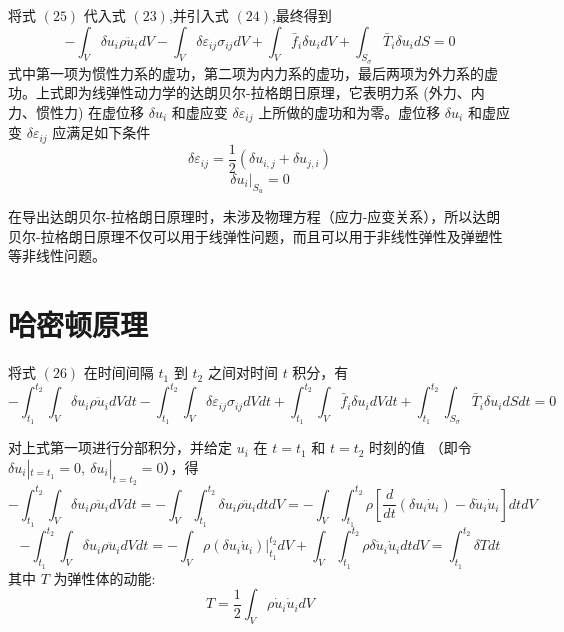 \documentclass[12pt,a4paper]{article}
\begin{document}
将式 $(25)$ 代入式 $(23)$,并引入式 $(24)$,最终得到
\begin{equation}
-\int_{V}\delta u_i\rho\ddot{u}_idV-\int_{V}\delta\varepsilon_{ij}\sigma_{ij}dV+\int_{V} \bar{f}_i\delta u_idV+\int_{S_{\sigma}}\bar{T}_i\delta u_idS=0
\end{equation}
式中第一项为惯性力系的虚功，第二项为内力系的虚功，最后两项为外力系的虚功。上式即为线弹性动力学的达朗贝尔-拉格朗日原理，它表明力系 (外力、内力、惯性力) 在虚位移 $\delta u_i$ 和虚应变 $\delta\varepsilon_{ij}$ 上所做的虚功和为零。虚位移 $\delta u_i$ 和虚应变 $\delta\varepsilon_{ij}$ 应满足如下条件
\begin{equation}
\delta\varepsilon_{ij}=\frac{1}{2}(\delta u_{i,j}+\delta u_{j,i})
\end{equation}
\begin{equation}
\delta u_i|_{S_u}=0
\end{equation}

在导出达朗贝尔-拉格朗日原理时，未涉及物理方程（应力-应变关系），所以达朗贝尔-拉格朗日原理不仅可以用于线弹性问题，而且可以用于非线性弹性及弹塑性等非线性问题。

\section{哈密顿原理}

将式 $(26)$ 在时间间隔 $t_1$ 到 $t_2$ 之间对时间 $t$ 积分，有
\begin{equation}
-\int_{t_1}^{t_2} \int_{V}\delta u_i\rho\ddot{u}_idVdt-\int_{t_1}^{t_2} \int_{V}\delta\varepsilon_{ij}\sigma_{ij}dVdt+\int_{t_1}^{t_2} \int_{V}\bar{f}_i\delta u_idVdt+\int_{t_1}^{t_2} \int_{S_{\sigma}}\bar{T}_i\delta u_idSdt=0
\end{equation}

对上式第一项进行分部积分，并给定 $u_i$ 在 $t=t_1$ 和 $t=t_2$ 时刻的值 （即令 $\delta u_i|_{t=t_1}=0,~\delta u_i|_{t=t_2}=0$），得
$$
-\int_{t_1}^{t_2} \int_{V}\delta u_i\rho\ddot{u}_idVdt=-\int_{V} \int_{t_1}^{t_2}\delta u_i\rho\ddot{u}_idtdV=-\int_{V} \int_{t_1}^{t_2}\rho\left[\frac{d}{dt}(\delta u_i\dot{u}_i)-\delta\dot{u}_i\dot{u}_i\right]dtdV
$$
\begin{equation}
-\int_{t_1}^{t_2} \int_{V}\delta u_i\rho\ddot{u}_idVdt=-\int_{V}\rho(\delta u_i\dot{u}_i)|^{t_2}_{t_1}dV+\int_{V} \int_{t_1}^{t_2}\rho\delta\dot{u}_i\dot{u}_idtdV=\int_{t_1}^{t_2} \delta Tdt
\end{equation}
其中 $T$ 为弹性体的动能:
\begin{equation}
T=\frac{1}{2}\int_{V}\rho\dot{u}_i\dot{u}_idV
\end{equation}
\end{document}
